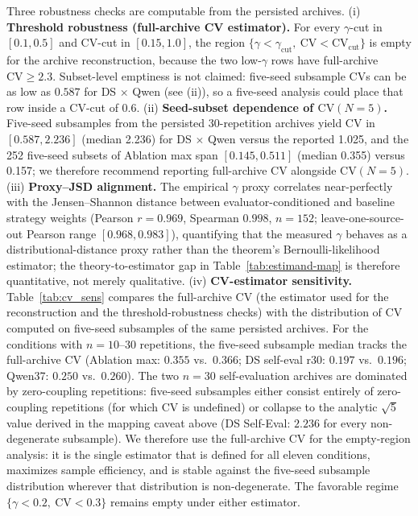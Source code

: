 \documentclass[11pt]{article}
\begin{document}
Three robustness checks are computable from the persisted archives. (i) \textbf{Threshold robustness (full-archive CV estimator).} For every $\gamma$-cut in $[0.1, 0.5]$ and $\mathrm{CV}$-cut in $[0.15, 1.0]$, the region $\{\gamma < \gamma_{\mathrm{cut}},\ \mathrm{CV} < \mathrm{CV}_{\mathrm{cut}}\}$ is empty for the archive reconstruction, because the two low-$\gamma$ rows have full-archive $\mathrm{CV} \geq 2.3$. Subset-level emptiness is not claimed: five-seed subsample $\mathrm{CV}$s can be as low as $0.587$ for DS $\times$ Qwen (see (ii)), so a five-seed analysis could place that row inside a $\mathrm{CV}$-cut of $0.6$. (ii) \textbf{Seed-subset dependence of $\mathrm{CV}(N{=}5)$.} Five-seed subsamples from the persisted 30-repetition archives yield $\mathrm{CV}$ in $[0.587, 2.236]$ (median 2.236) for DS $\times$ Qwen versus the reported 1.025, and the 252 five-seed subsets of Ablation max span $[0.145, 0.511]$ (median 0.355) versus 0.157; we therefore recommend reporting full-archive $\mathrm{CV}$ alongside $\mathrm{CV}(N{=}5)$. (iii) \textbf{Proxy--JSD alignment.} The empirical $\gamma$ proxy correlates near-perfectly with the Jensen--Shannon distance between evaluator-conditioned and baseline strategy weights (Pearson $r = 0.969$, Spearman $0.998$, $n = 152$; leave-one-source-out Pearson range $[0.968, 0.983]$), quantifying that the measured $\gamma$ behaves as a distributional-distance proxy rather than the theorem's Bernoulli-likelihood estimator; the theory-to-estimator gap in Table~\ref{tab:estimand-map} is therefore quantitative, not merely qualitative.
(iv) \textbf{CV-estimator sensitivity.} Table~\ref{tab:cv_sens} compares the full-archive CV (the estimator used for the reconstruction and the threshold-robustness checks) with the distribution of CV computed on five-seed subsamples of the same persisted archives. For the conditions with $n{=}10$--$30$ repetitions, the five-seed subsample median tracks the full-archive CV (Ablation max: $0.355$ vs.\ $0.366$; DS self-eval r30: $0.197$ vs.\ $0.196$; Qwen37: $0.250$ vs.\ $0.260$). The two $n{=}30$ self-evaluation archives are dominated by zero-coupling repetitions: five-seed subsamples either consist entirely of zero-coupling repetitions (for which CV is undefined) or collapse to the analytic $\sqrt{5}$ value derived in the mapping caveat above (DS Self-Eval: $2.236$ for every non-degenerate subsample). We therefore use the full-archive CV for the empty-region analysis: it is the single estimator that is defined for all eleven conditions, maximizes sample efficiency, and is stable against the five-seed subsample distribution wherever that distribution is non-degenerate. The favorable regime $\{\gamma<0.2,\ \mathrm{CV}<0.3\}$ remains empty under either estimator.
\end{document}
